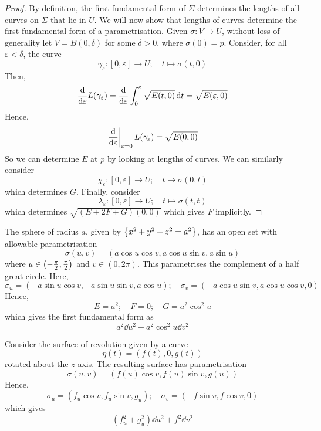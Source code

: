 \begin{proof}
	By definition, the first fundamental form of \( \Sigma \) determines the lengths of all curves on \( \Sigma \) that lie in \( U \).
	We will now show that lengths of curves determine the first fundamental form of a parametrisation.
	Given \( \sigma \colon V \to U \), without loss of generality let \( V = B(0,\delta) \) for some \( \delta > 0 \), where \( \sigma(0) = p \).
	Consider, for all \( \varepsilon < \delta \), the curve
	\[
		\gamma_\varepsilon \colon [0,\varepsilon] \to U;\quad t \mapsto \sigma(t,0)
	\]
	Then,
	\[
		\dv{\varepsilon} L(\gamma_\varepsilon) = \dv{\varepsilon} \int_0^\varepsilon \sqrt{E(t,0)} \dd{t} = \sqrt{E(\varepsilon,0)}
	\]
	Hence,
	\[
		\eval{\dv{\varepsilon}}_{\varepsilon = 0} L(\gamma_\varepsilon) = \sqrt{E(0,0)}
	\]
	So we can determine \( E \) at \( p \) by looking at lengths of curves.
	We can similarly consider
	\[
		\chi_\varepsilon \colon [0,\varepsilon] \to U;\quad t \mapsto \sigma(0,t)
	\]
	which determines \( G \).
	Finally, consider
	\[
		\lambda_\varepsilon \colon [0,\varepsilon] \to U;\quad t \mapsto \sigma(t,t)
	\]
	which determines \( \sqrt{(E+2F+G)(0,0)} \) which gives \( F \) implicitly.
\end{proof}
\begin{example}
	The sphere of radius \( a \), given by \( \qty{x^2 + y^2 + z^2 = a^2} \), has an open set with allowable parametrisation
	\[
		\sigma(u,v) = (a\cos u \cos v, a \cos u \sin v, a \sin u)
	\]
	where \( u \in \qty(-\frac{\pi}{2}, \frac{\pi}{2}) \) and \( v \in (0,2\pi) \).
	This parametrises the complement of a half great circle.
	Here,
	\[
		\sigma_u = (-a \sin u \cos v, -a \sin u \sin v, a \cos u);\quad \sigma_v = (-a \cos u \sin v, a \cos u \cos v, 0)
	\]
	Hence,
	\[
		E = a^2; \quad F = 0;\quad G = a^2 \cos^2 u
	\]
	which gives the first fundamental form as
	\[
		a^2 \dd{u}^2 + a^2 \cos^2 u \dd{v}^2
	\]
\end{example}
\begin{example}
	Consider the surface of revolution given by a curve
	\[
		\eta(t) = (f(t),0,g(t))
	\]
	rotated about the \( z \) axis.
	The resulting surface has parametrisation
	\[
		\sigma(u,v) = (f(u) \cos v, f(u) \sin v, g(u))
	\]
	Hence,
	\[
		\sigma_u = (f_u \cos v, f_u \sin v, g_u);\quad \sigma_v = (-f \sin v, f \cos v, 0)
	\]
	which gives
	\[
		(f_u^2 + g_u^2) \dd{u}^2 + f^2 \dd{v}^2
	\]
\end{example}
